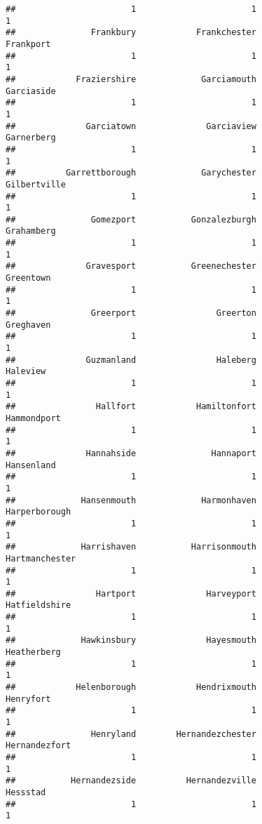 \documentclass[
]{article}
\begin{document}
\begin{verbatim}
##                       1                       1                       1 
##               Frankbury            Frankchester               Frankport 
##                       1                       1                       1 
##            Fraziershire             Garciamouth              Garciaside 
##                       1                       1                       1 
##              Garciatown              Garciaview              Garnerberg 
##                       1                       1                       1 
##          Garrettborough             Garychester            Gilbertville 
##                       1                       1                       1 
##               Gomezport           Gonzalezburgh              Grahamberg 
##                       1                       1                       1 
##              Gravesport           Greenechester               Greentown 
##                       1                       1                       1 
##               Greerport                Greerton               Greghaven 
##                       1                       1                       1 
##              Guzmanland                Haleberg                Haleview 
##                       1                       1                       1 
##                Hallfort            Hamiltonfort             Hammondport 
##                       1                       1                       1 
##              Hannahside               Hannaport              Hansenland 
##                       1                       1                       1 
##             Hansenmouth             Harmonhaven           Harperborough 
##                       1                       1                       1 
##             Harrishaven           Harrisonmouth          Hartmanchester 
##                       1                       1                       1 
##                Hartport              Harveyport           Hatfieldshire 
##                       1                       1                       1 
##             Hawkinsbury              Hayesmouth             Heatherberg 
##                       1                       1                       1 
##            Helenborough            Hendrixmouth               Henryfort 
##                       1                       1                       1 
##               Henryland        Hernandezchester           Hernandezfort 
##                       1                       1                       1 
##           Hernandezside          Hernandezville                Hessstad 
##                       1                       1                       1 

\end{verbatim}
\end{document}
